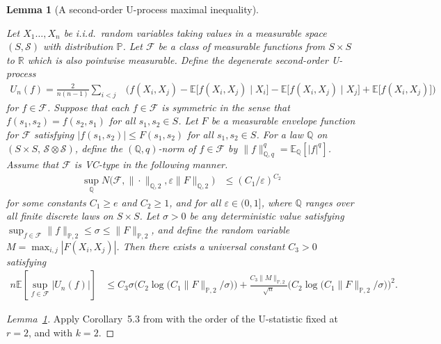 \documentclass[11pt,lof]{puthesis}
\renewcommand{\P}{\ensuremath{\mathbb{P}}}
\newcommand{\R}{\ensuremath{\mathbb{R}}}
\newcommand{\E}{\ensuremath{\mathbb{E}}}
\newcommand{\Q}{\ensuremath{\mathbb{Q}}}
\newcommand{\cF}{\ensuremath{\mathcal{F}}}
\newcommand{\cS}{\ensuremath{\mathcal{S}}}
\theoremstyle{break}
\newtheorem{lemma}{Lemma}[section]
\theoremstyle{proof}
\newtheorem{proof}{Proof}
\begin{document}
\begin{lemma}[A second-order U-process maximal inequality]
  \label{lem:kernel_app_uprocess_maximal}

  Let $X_1 \ldots, X_n$
  be i.i.d.\ random variables taking values
  in a measurable space $(S, \cS)$
  with distribution $\P$.
  Let $\cF$ be a class of measurable functions from
  $S \times S$ to $\R$ which is also pointwise measurable.
  Define the degenerate second-order U-process
  \begin{align*}
    U_n(f)
    =
    \frac{2}{n(n-1)}
    \sum_{i<j}
    &\Big(
      f(X_i, X_j)
      - \E\big[f(X_i,X_j) \mid X_i\big]
      -
      \E\big[f(X_i,X_j) \mid X_j\big]
      + \E\big[f(X_i,X_j)\big]
    \Big)
  \end{align*}
  for $f \in \cF$.
  Suppose that each $f \in \cF$ is symmetric in the sense that
  $f(s_1,s_2) = f(s_2,s_1)$
  for all $s_1, s_2 \in S$.
  Let $F$ be a measurable envelope function for $\cF$
  satisfying $|f(s_1,s_2)| \leq F(s_1,s_2)$
  for all $s_1,s_2 \in S$.
  For a law $\Q$ on
  $(S \times S, \, \cS \otimes \cS)$,
  define the $(\Q,q)$-norm of $f \in \cF$ by
  $\|f\|_{\Q,q}^q = \E_\Q[|f|^q]$.
  Assume that $\cF$ is VC-type in the following manner.
  \begin{align*}
    \sup_\Q
    N\big(
      \cF, \|\cdot\|_{\Q,2}, \varepsilon \|F\|_{\Q,2}
    \big)
    &\leq
    (C_1/\varepsilon)^{C_2}
  \end{align*}
  for some constants
  $C_1 \geq e$
  and $C_2 \geq 1$, and for all $\varepsilon \in (0,1]$, where $\Q$ ranges over
  all finite discrete laws on $S \times S$.
  Let $\sigma > 0$ be any deterministic value satisfying
  $\sup_{f \in \cF} \|f\|_{\P,2} \leq \sigma \leq \|F\|_{\P,2}$,
  and define the random variable $M = \max_{i,j} |F(X_i, X_j)|$.
  Then there exists a universal constant $C_3 > 0$
  satisfying
  \begin{align*}
    n
    \E\left[
      \sup_{f \in \cF}
      \big| U_n(f) \big|
    \right]
    &\leq
    C_3 \sigma
    \Big(
      C_2 \log\big(C_1 \|F\|_{\P,2} / \sigma \big)
    \Big)
    + \frac{C_3 \|M\|_{\P,2}}{\sqrt{n}}
    \Big(
      C_2 \log\big(C_1 \|F\|_{\P,2} / \sigma \big)
    \Big)^2.
  \end{align*}

\end{lemma}

\begin{proof}[Lemma~\ref{lem:kernel_app_uprocess_maximal}]

  Apply Corollary~5.3
  from \citet{chen2020jackknife}
  with the order of the U-statistic fixed at
  $r=2$,
  and with $k=2$.
\end{proof}
\end{document}
